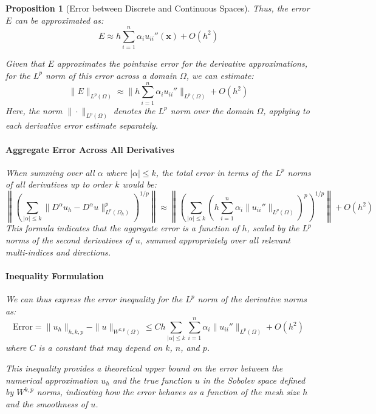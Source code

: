 \documentclass[11pt,a4paper]{article}
\theoremstyle{plain}
\newtheorem{proposition}[theorem]{Proposition}
\theoremstyle{definition}
\theoremstyle{remark}
\begin{document}
\begin{proposition}[Error between Discrete and Continuous Spaces]
Thus, the error \( E \) can be approximated as:
\[
E \approx h \sum_{i=1}^n \alpha_i u_{ii}''(\mathbf{x}) + O(h^2)
\]

Given that \( E \) approximates the pointwise error for the derivative approximations, for the \( L^p \) norm of this error across a domain \( \Omega \), we can estimate:
\[
\| E \|_{L^p(\Omega)} \approx \| h \sum_{i=1}^n \alpha_i u_{ii}'' \|_{L^p(\Omega)} + O(h^2)
\]
Here, the norm \( \| \cdot \|_{L^p(\Omega)} \) denotes the \( L^p \) norm over the domain \( \Omega \), applying to each derivative error estimate separately.

\paragraph*{Aggregate Error Across All Derivatives}

When summing over all \( \alpha \) where \( |\alpha| \leq k \), the total error in terms of the \( L^p \) norms of all derivatives up to order \( k \) would be:
\[
\left\| \left(\sum_{|\alpha| \leq k} \| D^\alpha u_h - D^\alpha u \|_{L^p(\Omega_h)}^p \right)^{1/p} \right\| \approx \left\| \left( \sum_{|\alpha| \leq k} \left(h \sum_{i=1}^n \alpha_i \| u_{ii}'' \|_{L^p(\Omega)} \right)^p \right)^{1/p} \right\| + O(h^2)
\]
This formula indicates that the aggregate error is a function of \( h \), scaled by the \( L^p \) norms of the second derivatives of \( u \), summed appropriately over all relevant multi-indices and directions.

\paragraph*{Inequality Formulation}

We can thus express the error inequality for the \( L^p \) norm of the derivative norms as:
\[
\text{Error} = \| u_h \|_{h,k,p} - \| u \|_{W^{k,p}(\Omega)} \leq C h \sum_{|\alpha| \leq k} \sum_{i=1}^n \alpha_i \| u_{ii}'' \|_{L^p(\Omega)} + O(h^2)
\]
where \( C \) is a constant that may depend on \( k \), \( n \), and \( p \).



This inequality provides a theoretical upper bound on the error between the numerical approximation \( u_h \) and the true function \( u \) in the Sobolev space defined by \( W^{k,p} \) norms, indicating how the error behaves as a function of the mesh size \( h \) and the smoothness of \( u \).
\end{proposition}
\end{document}
